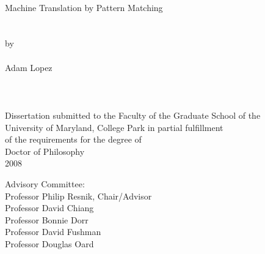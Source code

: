 
\thispagestyle{empty}
\hbox{\ }
\vspace{1in}
 \renewcommand{\baselinestretch}{1}
\small\normalsize
\begin{center}

\LARGE{{\sc Machine Translation by Pattern Matching}}\\
\ \\
\ \\
\large{by} \\
\ \\
\large{Adam Lopez}%
\ \\
\ \\
\ \\
\ \\
\normalsize
Dissertation submitted to the Faculty of the Graduate School of the \\
University of Maryland, College Park in partial fulfillment \\
of the requirements for the degree of \\
Doctor of Philosophy \\
2008
\end{center}

\vspace{7.5em}

\noindent Advisory Committee: \\
Professor Philip Resnik, Chair/Advisor \\
Professor David Chiang \\
Professor Bonnie Dorr \\
Professor David Fushman \\
Professor Douglas Oard
